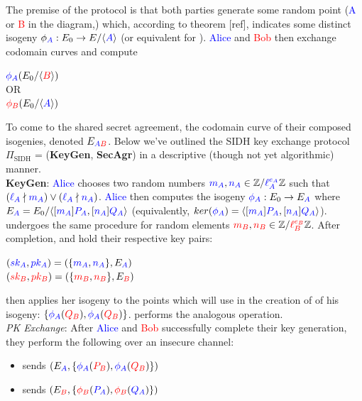 The premise of the protocol is that both parties generate some random point (\textcolor{blue}{A} or \textcolor{red}{B} in the diagram,) which, according to theorem [ref], indicates some distinct isogeny $\phi_{\textcolor{blue}{A}}: E_0 \rightarrow E/ \langle \textcolor{blue}{A} \rangle$ (or equivalent for \rb). \textcolor{blue}{Alice} and \textcolor{red}{Bob} then exchange codomain curves and compute
\begin{center}
$\textcolor{blue}{\phi_A}(E_0/\langle \textcolor{red}{B} \rangle)$\\
$\text{OR}$\\
$\textcolor{red}{\phi_B}(E_0/\langle \textcolor{blue}{A} \rangle)$
\end{center}
To come to the shared secret agreement, the codomain curve of their composed isogenies, denoted $E_{\textcolor{blue}{A}\textcolor{red}{B}}$. Below we've outlined the SIDH key exchange protocol $\Pi_{\text{SIDH}}$ = (\textbf{KeyGen}, \textbf{SecAgr}) in a descriptive (though not yet algorithmic) manner.\\

\noindent
\textbf{KeyGen}: \textcolor{blue}{Alice} chooses two random numbers $\textcolor{blue}{m_A}, \textcolor{blue}{n_A} \in \mathbb{Z}/\textcolor{blue}{\ell_{A}^{e_A}}\mathbb{Z}$ such that $(\textcolor{blue}{\ell_{A}} \nmid \textcolor{blue}{m_A}) \lor (\textcolor{blue}{\ell_{A}} \nmid \textcolor{blue}{n_A})$. \textcolor{blue}{Alice} then computes the isogeny $\textcolor{blue}{\phi_A}: E_0 \rightarrow E_{\textcolor{blue}{A}}$ where $E_{\textcolor{blue}{A}} = E_0 / \langle [\textcolor{blue}{m_A}]\textcolor{blue}{P_A}, [\textcolor{blue}{n_A}]\textcolor{blue}{Q_A}\rangle$ (equivalently, $ker(\textcolor{blue}{\phi_A}) = \langle [\textcolor{blue}{m_A}]\textcolor{blue}{P_A}, [\textcolor{blue}{n_A}]\textcolor{blue}{Q_A}\rangle$). \bob undergoes the same procedure for random elements $\textcolor{red}{m_B}, \textcolor{red}{n_B} \in \mathbb{Z}/\textcolor{red}{\ell_{B}^{e_B}}\mathbb{Z}$. After completion, \alice and \bob hold their respective key pairs:
\begin{center}
$(\textcolor{blue}{sk_A}, \textcolor{blue}{pk_A}) = (\{\textcolor{blue}{m_A},\textcolor{blue}{n_A}\}, E_{\textcolor{blue}{A}})$\\
$(\textcolor{red}{sk_B}, \textcolor{red}{pk_B}) = (\{\textcolor{red}{m_B},\textcolor{red}{n_B}\}, E_{\textcolor{red}{B}})$\\
\end{center}

\alice then applies her isogeny to the points which \bob will use in the creation of of his isogeny: $\{\textcolor{blue}{\phi_A}(\textcolor{red}{Q_B}),\textcolor{blue}{\phi_A}(\textcolor{red}{Q_B})\}$. \bob performs the analogous operation.\\

\noindent
\textit{PK Exchange}: After \textcolor{blue}{Alice} and \textcolor{red}{Bob} successfully complete their key generation, they perform the following over an insecure channel:
\begin{itemize}
\item \alice sends \bob $(E_{\textcolor{blue}{A}}, \{\textcolor{blue}{\phi_A}(\textcolor{red}{P_B}),\textcolor{blue}{\phi_A}(\textcolor{red}{Q_B})\})$
\item \bob sends \alice $(E_{\textcolor{red}{B}}, \{\textcolor{red}{\phi_B}(\textcolor{blue}{P_A}),\textcolor{red}{\phi_B}(\textcolor{blue}{Q_A})\})$
\end{itemize}

